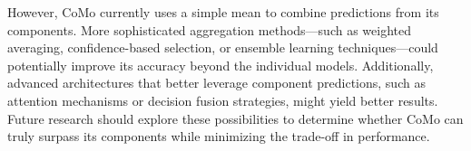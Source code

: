 However, CoMo currently uses a simple mean to combine predictions from its components. More sophisticated aggregation methods—such as weighted averaging, confidence-based selection, or ensemble learning techniques—could potentially improve its accuracy beyond the individual models. Additionally, advanced architectures that better leverage component predictions, such as attention mechanisms or decision fusion strategies, might yield better results. Future research should explore these possibilities to determine whether CoMo can truly surpass its components while minimizing the trade-off in performance.
